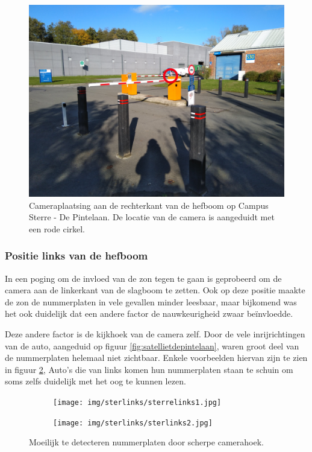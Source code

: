 \begin{figure}[h!]
	\centering
	\includegraphics[width=0.8\linewidth]{img/depintelaanorigineel.jpg}
	\caption{Cameraplaatsing aan de rechterkant van de hefboom op Campus Sterre - De Pintelaan. De locatie van de camera is aangeduidt met een rode cirkel.}
	\label{plaatsingdepintelaanorigineel}
\end{figure}

\subsubsection{Positie links van de hefboom}

In een poging om de invloed van de zon tegen te gaan is geprobeerd om de camera aan de linkerkant van de slagboom te zetten. Ook op deze positie maakte de zon de nummerplaten in vele gevallen minder leesbaar, maar bijkomend was het ook duidelijk dat een andere factor de nauwkeurigheid zwaar beïnvloedde.

Deze andere factor is de kijkhoek van de camera zelf. Door de vele inrijrichtingen van de auto, aangeduid op figuur \ref{fig:satellietdepintelaan}, waren groot deel van de nummerplaten helemaal niet zichtbaar. Enkele voorbeelden hiervan zijn te zien in figuur \ref{fig:sterre-links}, Auto's die van links komen hun nummerplaten staan te schuin om soms zelfs duidelijk met het oog te kunnen lezen.

\begin{figure}[h!]
	\centering
	\begin{subfigure}[b]{0.4\linewidth}
		\texttt{[image: img/sterlinks/sterrelinks1.jpg]}
	\end{subfigure}
	\begin{subfigure}[b]{0.4\linewidth}
		\texttt{[image: img/sterlinks/sterlinks2.jpg]}
	\end{subfigure}
	\label{fig:sterre-links}
	\caption{Moeilijk te detecteren nummerplaten door scherpe camerahoek.}
\end{figure}

